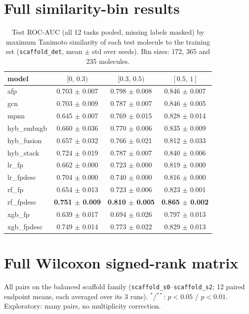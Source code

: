 \documentclass[conference]{IEEEtran}
\newcommand{\code}[1]{\texttt{\small #1}}
\begin{document}
\clearpage
\section{Full similarity-bin results}
\label{app:simbins}
\begin{table}[h]
\centering
\caption{Test ROC-AUC (all 12 tasks pooled, missing labels masked) by maximum Tanimoto
similarity of each test molecule to the training set (\code{scaffold\_det}, mean $\pm$ std over
seeds). Bin sizes: 172, 365 and 235 molecules.}
\small
\begin{tabular}{lccc}
\toprule
model & $[0,\,0.3)$ & $[0.3,\,0.5)$ & $[0.5,\,1]$ \\
\midrule
afp & 0.703 $\pm$ 0.007 & 0.798 $\pm$ 0.008 & 0.846 $\pm$ 0.007 \\
gcn & 0.703 $\pm$ 0.009 & 0.787 $\pm$ 0.007 & 0.846 $\pm$ 0.005 \\
mpnn & 0.645 $\pm$ 0.007 & 0.769 $\pm$ 0.015 & 0.828 $\pm$ 0.014 \\
hyb\_embxgb & 0.660 $\pm$ 0.036 & 0.770 $\pm$ 0.006 & 0.835 $\pm$ 0.009 \\
hyb\_fusion & 0.657 $\pm$ 0.032 & 0.766 $\pm$ 0.021 & 0.812 $\pm$ 0.033 \\
hyb\_stack & 0.724 $\pm$ 0.019 & 0.787 $\pm$ 0.007 & 0.840 $\pm$ 0.006 \\
lr\_fp & 0.662 $\pm$ 0.000 & 0.723 $\pm$ 0.000 & 0.819 $\pm$ 0.000 \\
lr\_fpdesc & 0.704 $\pm$ 0.000 & 0.740 $\pm$ 0.000 & 0.816 $\pm$ 0.000 \\
rf\_fp & 0.654 $\pm$ 0.013 & 0.723 $\pm$ 0.006 & 0.823 $\pm$ 0.001 \\
rf\_fpdesc & \textbf{0.751 $\pm$ 0.009} & \textbf{0.810 $\pm$ 0.005} & \textbf{0.865 $\pm$ 0.002} \\
xgb\_fp & 0.639 $\pm$ 0.017 & 0.694 $\pm$ 0.026 & 0.797 $\pm$ 0.013 \\
xgb\_fpdesc & 0.749 $\pm$ 0.014 & 0.773 $\pm$ 0.022 & 0.829 $\pm$ 0.013 \\
\bottomrule
\end{tabular}
\end{table}

\clearpage
\onecolumn
\section{Full Wilcoxon signed-rank matrix}
\label{app:wilcoxon}
All pairs on the balanced scaffold family (\code{scaffold\_s0}--\code{scaffold\_s2}; 12 paired
endpoint means, each averaged over its 3 runs). $^{*}$/$^{**}$: $p<0.05$ / $p<0.01$.
Exploratory: many pairs, no multiplicity correction.
\end{document}
